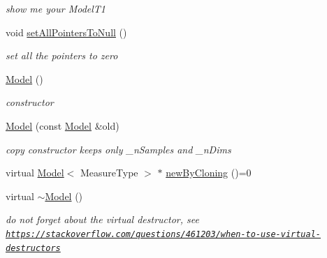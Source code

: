 \begin{DoxyCompactItemize}
\begin{DoxyCompactList}\small\item\em show me your Model\-T1 \end{DoxyCompactList}\item 
\hypertarget{class_ox_1_1_model_a8186fd758a6f94d9e3af204b6c1aac3c}{void \hyperlink{class_ox_1_1_model_a8186fd758a6f94d9e3af204b6c1aac3c}{set\-All\-Pointers\-To\-Null} ()}\label{class_ox_1_1_model_a8186fd758a6f94d9e3af204b6c1aac3c}

\begin{DoxyCompactList}\small\item\em set all the pointers to zero \end{DoxyCompactList}\item 
\hypertarget{class_ox_1_1_model_a73f93cd40d0eddc1d3ff474fc2505fc2}{\hyperlink{class_ox_1_1_model_a73f93cd40d0eddc1d3ff474fc2505fc2}{Model} ()}\label{class_ox_1_1_model_a73f93cd40d0eddc1d3ff474fc2505fc2}

\begin{DoxyCompactList}\small\item\em constructor \end{DoxyCompactList}\item 
\hyperlink{class_ox_1_1_model_a01911912db830e4814645a675990a906}{Model} (const \hyperlink{class_ox_1_1_model}{Model} \&old)
\begin{DoxyCompactList}\small\item\em copy constructor keeps only \-\_\-n\-Samples and \-\_\-n\-Dims \end{DoxyCompactList}\item 
virtual \hyperlink{class_ox_1_1_model}{Model}$<$ Measure\-Type $>$ $\ast$ \hyperlink{class_ox_1_1_model_a694868476dd17a4d203f4ebc57047d2f}{new\-By\-Cloning} ()=0
\item 
\hypertarget{class_ox_1_1_model_a6353ac7352cdbbed2d00d9ed9e697c88}{virtual \hyperlink{class_ox_1_1_model_a6353ac7352cdbbed2d00d9ed9e697c88}{$\sim$\-Model} ()}\label{class_ox_1_1_model_a6353ac7352cdbbed2d00d9ed9e697c88}

\begin{DoxyCompactList}\small\item\em do not forget about the virtual destructor, see \href{https://stackoverflow.com/questions/461203/when-to-use-virtual-destructors}{\tt https\-://stackoverflow.\-com/questions/461203/when-\/to-\/use-\/virtual-\/destructors} \end{DoxyCompactList}\end{DoxyCompactItemize}
